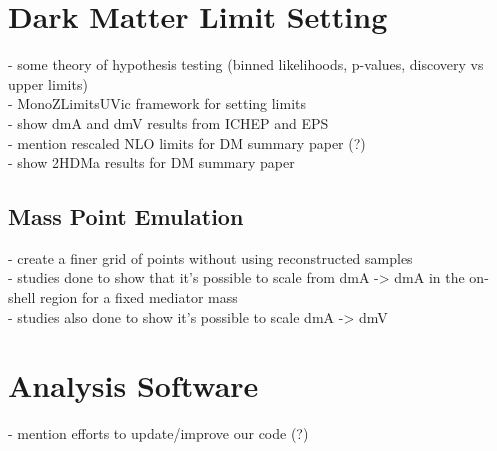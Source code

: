 \section{Dark Matter Limit Setting}

- some theory of hypothesis testing (binned likelihoods, p-values, discovery vs upper limits)\\
- MonoZLimitsUVic framework for setting limits\\
- show dmA and dmV results from ICHEP and EPS\\
- mention rescaled NLO limits for DM summary paper (?)\\
- show 2HDMa results for DM summary paper\\

\subsection{Mass Point Emulation}

- create a finer grid of points without using reconstructed samples\\
- studies done to show that it's possible to scale from dmA -> dmA in the on-shell region for a fixed mediator mass\\
- studies also done to show it's possible to scale dmA -> dmV\\

\section{Analysis Software}
- mention efforts to update/improve our code (?)